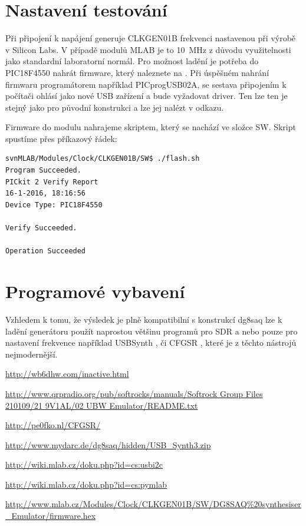 \documentclass[12pt,a4paper,oneside]{article}
\begin{document}
\section{Nastavení testování}
Při připojení k napájení generuje CLKGEN01B frekvenci nastavenou při výrobě v Silicon Labs. V případě modulů MLAB je to 10~MHz z důvodu využitelnosti jako standardní laboratorní normál.  Pro možnost ladění je potřeba do PIC18F4550 nahrát firmware, který naleznete na \cite{pic_firmware}. Při úspěšném nahrání firmwaru programátorem například PICprogUSB02A, se sestava připojením k počítači ohlásí jako nové USB zařízení a bude vyžadovat driver. Ten lze ten je stejný jako pro původní konstrukci a lze jej nalézt v odkazu\cite{CFGSR}.

\noindent Firmware do modulu nahrajeme skriptem, který se nachází ve složce SW. Skript spustíme přes příkazový řádek:

\begin{lstlisting}[language=bash]
svnMLAB/Modules/Clock/CLKGEN01B/SW$ ./flash.sh
Program Succeeded.
PICkit 2 Verify Report
16-1-2016, 18:16:56
Device Type: PIC18F4550

Verify Succeeded.

Operation Succeeded
\end{lstlisting}


\section{Programové vybavení}
Vzhledem k tomu, že výsledek je plně kompatibilní s  konstrukcí dg8saq lze k ladění generátoru použít naprostou většinu programů pro SDR a nebo pouze pro nastavení frekvence například USBSynth \cite{USB_Synth}, či CFGSR \cite{CFGSR}, které je z těchto nástrojů nejmodernější.

\begin{thebibliography}{99}
\href{http://wb6dhw.com/inactive.html}{http://wb6dhw.com/inactive.html}

\href{http://www.qrpradio.org/pub/softrocks/manuals/Softrock Group Files 210109/21 9V1AL/02 UBW Emulator/README.txt}{http://www.qrpradio.org/pub/softrocks/manuals/Softrock Group Files 210109/21 9V1AL/02 UBW Emulator/README.txt}

\href{http://pe0fko.nl/CFGSR/}{http://pe0fko.nl/CFGSR/}

\href{ http://www.mydarc.de/dg8saq/hidden/USB\_Synth3.zip}{http://www.mydarc.de/dg8saq/hidden/USB\_Synth3.zip}

\href{http://wiki.mlab.cz/doku.php?id=cs:usbi2c}{http://wiki.mlab.cz/doku.php?id=cs:usbi2c}

\href{http://wiki.mlab.cz/doku.php?id=cs:pymlab}{http://wiki.mlab.cz/doku.php?id=cs:pymlab}

\href{http://www.mlab.cz/Modules/Clock/CLKGEN01B/SW/DG8SAQ\%20synthesiser\_Emulator/firmware.hex}{http://www.mlab.cz/Modules/Clock/CLKGEN01B/SW/DG8SAQ\%20synthesiser\_Emulator/firmware.hex}


\end{thebibliography}
\end{document}
